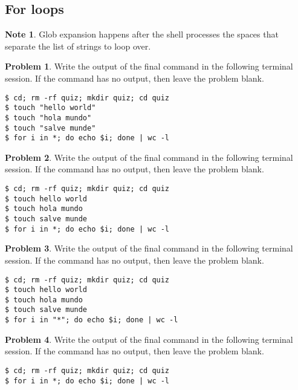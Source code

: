 \documentclass[10pt]{article}
\theoremstyle{definition}
\newtheorem{problem}{Problem}
\newtheorem{note}{Note}
\begin{document}
\subsection{For loops}
\begin{note}
    Glob expansion happens after the shell processes the spaces that separate the list of strings to loop over.
\end{note}

\filbreak
\begin{problem}
    Write the output of the final command in the following terminal session.
    If the command has no output, then leave the problem blank.
\end{problem}
\begin{lstlisting}
$ cd; rm -rf quiz; mkdir quiz; cd quiz
$ touch "hello world"
$ touch "hola mundo"
$ touch "salve munde"
$ for i in *; do echo $i; done | wc -l
\end{lstlisting}

\filbreak
\begin{problem}
    Write the output of the final command in the following terminal session.
    If the command has no output, then leave the problem blank.
\end{problem}
\begin{lstlisting}
$ cd; rm -rf quiz; mkdir quiz; cd quiz
$ touch hello world
$ touch hola mundo
$ touch salve munde
$ for i in *; do echo $i; done | wc -l
\end{lstlisting}


\filbreak
\begin{problem}
    Write the output of the final command in the following terminal session.
    If the command has no output, then leave the problem blank.
\end{problem}
\begin{lstlisting}
$ cd; rm -rf quiz; mkdir quiz; cd quiz
$ touch hello world
$ touch hola mundo
$ touch salve munde
$ for i in "*"; do echo $i; done | wc -l
\end{lstlisting}

\filbreak
\begin{problem}
    Write the output of the final command in the following terminal session.
    If the command has no output, then leave the problem blank.
\end{problem}
\begin{lstlisting}
$ cd; rm -rf quiz; mkdir quiz; cd quiz
$ for i in *; do echo $i; done | wc -l
\end{lstlisting}
\end{document}
